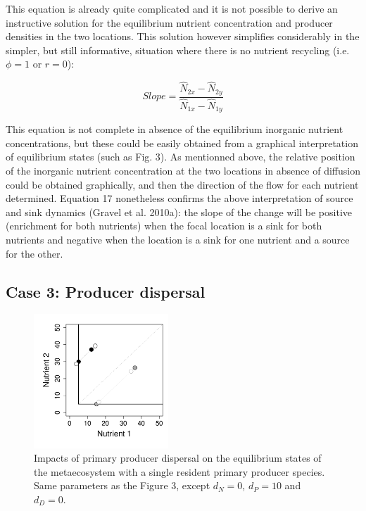 \documentclass[letterpaper,twocolumn,showkeys]{revtex4-1}
\begin{document}
	This equation is already quite complicated and it is not possible to derive an instructive solution for the equilibrium nutrient concentration and producer densities in the two locations. This solution however simplifies considerably in the simpler, but still informative, situation where there is no nutrient recycling (i.e. $\phi = 1$ or $r = 0$):

\begin{equation}
	\label{e:bnet}
	Slope=\frac{\widehat{N}_{2x}-\widehat{N}_{2y}}{\widehat{N}_{1x}-\widehat{N}_{1y}}
\end{equation}

This equation is not complete in absence of the equilibrium inorganic nutrient concentrations, but these could be easily obtained from a graphical interpretation of equilibrium states (such as Fig. 3). As mentionned above, the relative position of the inorganic nutrient concentration at the two locations in absence of diffusion could be obtained graphically, and then the direction of the flow for each nutrient determined. Equation 17 nonetheless confirms the above interpretation of source and sink dynamics (Gravel et al. 2010a): the slope of the change will be positive (enrichment for both nutrients) when the focal location is a sink for both nutrients and negative when the location is a sink for one nutrient and a source for the other.

\subsection{Case 3: Producer dispersal}

\begin{figure}[tb]
   \centering
   \includegraphics[width=0.45\textwidth]{ProducerDiffusion.pdf}
   \caption{Impacts of primary producer dispersal on the equilibrium states of the metaecosystem with a single resident primary producer species. Same parameters as the Figure 3, except $d_N = 0$, $d_P = 10$ and $d_D = 0$.}
   \label{f:Producers}
\end{figure}
\end{document}

